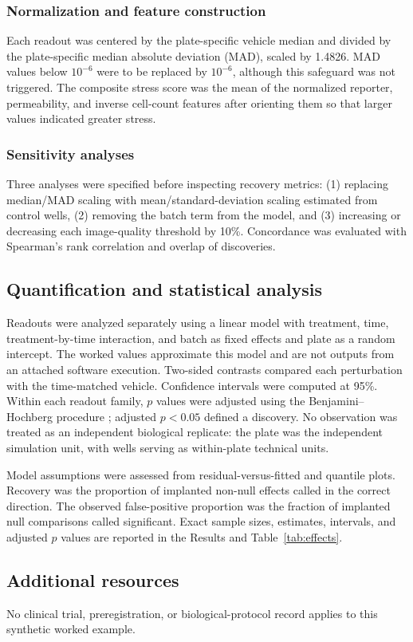\subsubsection{Normalization and feature construction}
Each readout was centered by the plate-specific vehicle median and divided by
the plate-specific median absolute deviation (MAD), scaled by 1.4826. MAD values
below $10^{-6}$ were to be replaced by $10^{-6}$, although this safeguard was not
triggered. The composite stress score was the mean of the normalized reporter,
permeability, and inverse cell-count features after orienting them so that larger
values indicated greater stress.

\subsubsection{Sensitivity analyses}
Three analyses were specified before inspecting recovery metrics: (1) replacing
median/MAD scaling with mean/standard-deviation scaling estimated from control
wells, (2) removing the batch term from the model, and (3) increasing or
decreasing each image-quality threshold by 10\%. Concordance was evaluated with
Spearman's rank correlation and overlap of discoveries.

\subsection{Quantification and statistical analysis}
Readouts were analyzed separately using a linear model with treatment, time,
treatment-by-time interaction, and batch as fixed effects and plate as a random
intercept. The worked values approximate this model and are not outputs from an
attached software execution. Two-sided contrasts compared each perturbation with
the time-matched vehicle. Confidence intervals were computed at 95\%. Within each
readout family, $p$ values were adjusted using the Benjamini--Hochberg procedure
\citep{benjamini1995}; adjusted $p<0.05$ defined a discovery. No observation was
treated as an independent biological replicate: the plate was the independent
simulation unit, with wells serving as within-plate technical units.

Model assumptions were assessed from residual-versus-fitted and quantile plots.
Recovery was the proportion of implanted non-null effects called in the correct
direction. The observed false-positive proportion was the fraction of implanted
null comparisons called significant. Exact sample sizes, estimates, intervals,
and adjusted $p$ values are reported in the Results and Table~\ref{tab:effects}.

\subsection{Additional resources}
No clinical trial, preregistration, or biological-protocol record applies to this
synthetic worked example.
